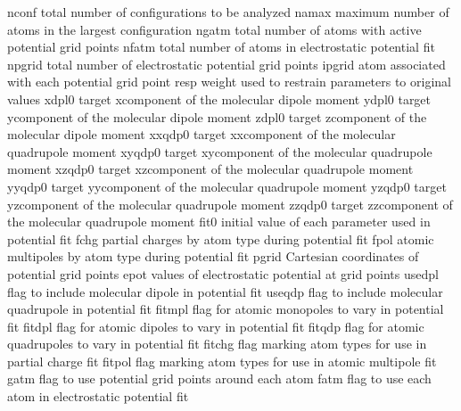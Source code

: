 \documentclass[letterpaper,11pt,english]{sphinxmanual}
\begin{document}

\begin{sphinxVerbatim}[commandchars=\\\{\}]
nconf           total number of configurations to be analyzed
namax           maximum number of atoms in the largest configuration
ngatm           total number of atoms with active potential grid points
nfatm           total number of atoms in electrostatic potential fit
npgrid          total number of electrostatic potential grid points
ipgrid          atom associated with each potential grid point
resp            weight used to restrain parameters to original values
xdpl0           target x\PYGZhy{}component of the molecular dipole moment
ydpl0           target y\PYGZhy{}component of the molecular dipole moment
zdpl0           target z\PYGZhy{}component of the molecular dipole moment
xxqdp0          target xx\PYGZhy{}component of the molecular quadrupole moment
xyqdp0          target xy\PYGZhy{}component of the molecular quadrupole moment
xzqdp0          target xz\PYGZhy{}component of the molecular quadrupole moment
yyqdp0          target yy\PYGZhy{}component of the molecular quadrupole moment
yzqdp0          target yz\PYGZhy{}component of the molecular quadrupole moment
zzqdp0          target zz\PYGZhy{}component of the molecular quadrupole moment
fit0            initial value of each parameter used in potential fit
fchg            partial charges by atom type during potential fit
fpol            atomic multipoles by atom type during potential fit
pgrid           Cartesian coordinates of potential grid points
epot            values of electrostatic potential at grid points
use\PYGZus{}dpl         flag to include molecular dipole in potential fit
use\PYGZus{}qdp         flag to include molecular quadrupole in potential fit
fit\PYGZus{}mpl         flag for atomic monopoles to vary in potential fit
fit\PYGZus{}dpl         flag for atomic dipoles to vary in potential fit
fit\PYGZus{}qdp         flag for atomic quadrupoles to vary in potential fit
fitchg          flag marking atom types for use in partial charge fit
fitpol          flag marking atom types for use in atomic multipole fit
gatm            flag to use potential grid points around each atom
fatm            flag to use each atom in electrostatic potential fit
\end{sphinxVerbatim}

\end{document}
